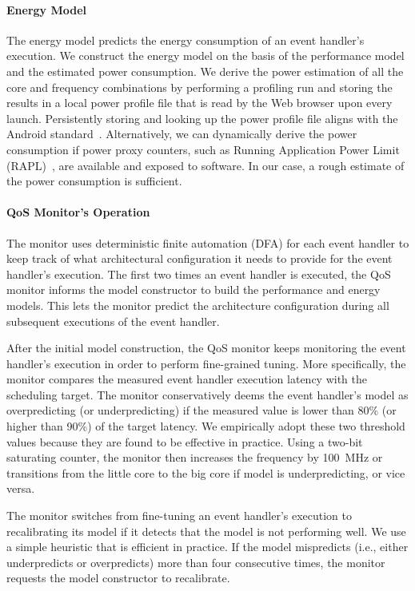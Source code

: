 \paragraph{Energy Model} The energy model predicts the energy consumption of an event handler's execution. We construct the energy model on the basis of the performance model and the estimated power consumption. We derive the power estimation of all the core and frequency combinations by performing a profiling run and storing the results in a local power profile file that is read by the Web browser upon every launch. Persistently storing and looking up the power profile file aligns with the Android standard~\cite{powerxml}. Alternatively, we can dynamically derive the power consumption if power proxy counters, such as Running Application Power Limit (RAPL)~\cite{rapl}, are available and exposed to software. In our case, a rough estimate of the power consumption is sufficient.

\paragraph{QoS Monitor's Operation} The monitor uses deterministic finite automation (DFA) for each event handler to keep track of what architectural configuration it needs to provide for the event handler's execution. The first two times an event handler is executed, the QoS monitor informs the model constructor to build the performance and energy models. This lets the monitor predict the architecture configuration during all subsequent executions of the event handler.

After the initial model construction, the QoS monitor keeps monitoring the event handler's execution in order to perform fine-grained tuning. More specifically, the monitor compares the measured event handler execution latency with the scheduling target. The monitor conservatively deems the event handler's model as overpredicting (or underpredicting) if the measured value is lower than 80\% (or higher than 90\%) of the target latency. We empirically adopt these two threshold values because they are found to be effective in practice. Using a two-bit saturating counter, the monitor then increases the frequency by 100~MHz or transitions from the little core to the big core if model is underpredicting, or vice versa.

The monitor switches from fine-tuning an event handler's execution to recalibrating its model if it detects that the model is not performing well. We use a simple heuristic that is efficient in practice. If the model mispredicts (i.e., either underpredicts or overpredicts) more than four consecutive times, the monitor requests the model constructor to recalibrate.

